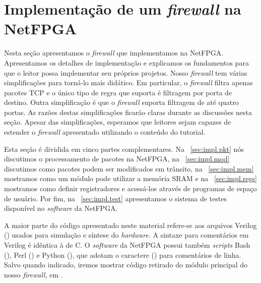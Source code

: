\newpage
\section{Implementação de um \emph{firewall} na NetFPGA}
\label{sec:impl}

Nesta seção apresentamos o \emph{firewall} que implementamos na NetFPGA.
Apresentamos os detalhes de implementação e explicamos os fundamentos
para que o leitor possa implementar seu próprios projetos.  Nosso
\emph{firewall} tem várias simplificações para torná-lo mais didático.
Em particular, o \emph{firewall} filtra apenas pacotes TCP e o único
tipo de regra que suporta é filtragem por porta de destino.  Outra
simplificação é que o \emph{firewall} suporta filtragem de até quatro
portas.  As razões destas simplificações ficarão claras durante as
discussões nesta seção.  Apesar das simplificações, esperamos que
leitores sejam capazes de estender o \emph{firewall} apresentado
utilizando o conteúdo do tutorial.

Esta seção é dividida em cinco partes complementares.  Na
\secstr~\ref{sec:impl.pkt} nós discutimos o processamento de pacotes na
NetFPGA, na \secstr~\ref{sec:impl.mod} discutimos como pacotes podem ser
modificados em trânsito, na \secstr~\ref{sec:impl.mem} mostramos como um
módulo pode utilizar a memória SRAM e na \secstr~\ref{sec:impl.regs}
mostramos como definir registradores e acessá-los através de programas
de espaço de usuário.  Por fim, na \secstr~\ref{sec:impl.test}
apresentamos o sistema de testes disponível no \emph{software} da
NetFPGA.

A maior parte do código apresentado neste material refere-se aos
arquivos Verilog () usados para simulação e síntese do
\emph{hardware}.  A sintaxe para comentários em Verilog é idêntica à de
C.\footnotemark{}  O \emph{software} da NetFPGA possui também
\emph{scripts} Bash (), Perl () e Python (),
que adotam o caractere (\ssf{\#}) para comentários de linha.  Salvo
quando indicado, iremos mostrar código retirado do módulo principal do
nosso \emph{firewall}, em
.












